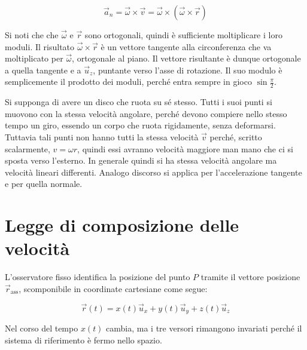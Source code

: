 \[
	\vec{a}_n=\vec{\omega} \times \vec{v}=\vec{\omega} \times ( \vec{\omega} \times \vec{r})
\]

Si noti che che $\vec{\omega}$ e $\vec{r}$ sono ortogonali, quindi è sufficiente moltiplicare i loro moduli. Il risultato $\vec{\omega} \times \vec{r}$ è un vettore tangente alla circonferenza che va moltiplicato per $\vec{\omega}$, ortogonale al piano. Il vettore risultante è dunque ortogonale a quella tangente e a $\vec{u}_z$, puntante verso l'asse di rotazione. Il suo modulo è semplicemente il prodotto dei moduli, perché entra sempre in gioco $\sin\frac{\pi}{2}$.

Si supponga di avere un disco che ruota su sé stesso. Tutti i suoi punti si muovono con la stessa velocità angolare, perché devono compiere nello stesso tempo un giro, essendo un corpo che ruota rigidamente, senza deformarsi. Tuttavia tali punti non hanno tutti la stessa velocità $\vec{v}$ perché, scritto scalarmente, $v=\omega r$, quindi essi avranno velocità maggiore man mano che ci si sposta verso l'esterno. In generale quindi si ha stessa velocità angolare ma velocità lineari differenti. Analogo discorso si applica per l'accelerazione tangente e per quella normale.

\section{Legge di composizione delle velocità}

L'osservatore fisso identifica la posizione del punto $P$ tramite il vettore posizione $\vec{r}_{\text{ass}}$, scomponibile in coordinate cartesiane come segue:

\[
	\vec{r}(t)=x(t) \vec{u}_x+y(t)\vec{u}_y+z(t)\vec{u}_z
\]

Nel corso del tempo $x(t)$ cambia, ma i tre versori rimangono invariati perché il sistema di riferimento è fermo nello spazio.

